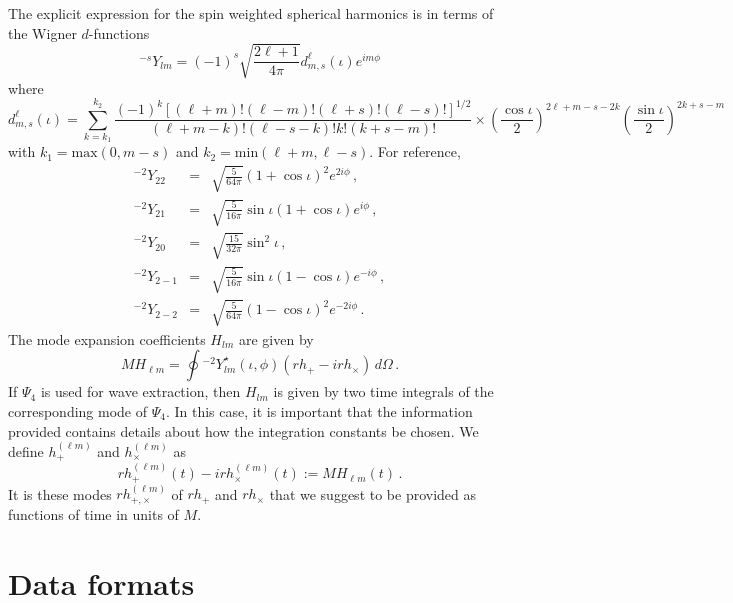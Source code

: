 \documentclass[prd,preprintnumbers,superscriptaddress,eqsecnum]{revtex4}
\numberwithin{equation}{section}
\newcommand{\Ys}{{{}^{-s}Y}}
\newcommand{\Ytwo}{{{}^{-2}Y}}
\begin{document}
{The explicit expression for the spin weighted spherical harmonics is
in terms of the Wigner $d$-functions
\begin{equation}
  \label{eq:5}
   \Ys_{lm} = (-1)^s\sqrt{\frac{2\ell+1}{4\pi}} d^\ell_{m,s}(\iota)e^{im\phi}
\end{equation}
where
\begin{equation}
  \label{eq:6}
  d^\ell_{m,s}(\iota) = \sum_{k = k_1}^{k_2}
    \frac{(-1)^k[(\ell+m)!(\ell-m)!(\ell+s)!(\ell-s)!]^{1/2}}{(\ell +m
      -k)!(\ell-s-k)!k!(k+s-m)!}  
    \times \left(\frac{\cos\iota}{2}\right)^{2\ell+m-s-2k}\left(\frac{\sin\iota}{2}\right)^{2k+s-m}  
\end{equation}
with $k_1 = \textrm{max}(0, m-s)$ and $k_2=\textrm{min}(\ell+m,
\ell-s)$.  For reference,
\begin{eqnarray}
  \label{eq:7}
  \Ytwo_{22} &=& \sqrt{\frac{5}{64\pi}}(1+\cos\iota)^2e^{2i\phi} \,,\\
  \Ytwo_{21} &=& \sqrt{\frac{5}{16\pi}}  \sin\iota( 1 + \cos\iota )e^{i\phi} \,,\\
  \Ytwo_{20} &=& \sqrt{\frac{15}{32\pi}} \sin^2\iota \,,\\
  \Ytwo_{2-1} &=& \sqrt{\frac{5}{16\pi}}  \sin\iota( 1 - \cos\iota
  )e^{-i\phi} \,,\\
  \Ytwo_{2-2} &=& \sqrt{\frac{5}{64\pi}}(1-\cos\iota)^2e^{-2i\phi}\,.
\end{eqnarray}
The mode expansion coefficients $H_{lm}$ are given by
\begin{equation}
  \label{eq:10}
  MH_{\ell m} = \oint \Ytwo_{lm}^\star(\iota,\phi)(rh_+-irh_\times )\,d\Omega\,.
\end{equation}
If $\Psi_4$ is used for wave extraction, then $H_{lm}$ is given by two
time integrals of the corresponding mode of $\Psi_4$.  In this case, it
is important that the information provided contains details about how
the integration constants be chosen.  We define $h_+^{(\ell m)}$ and
$h_\times^{(\ell m)}$ as
\begin{equation}
  \label{eq:11}
  rh_+^{(\ell m)}(t) -irh_\times^{(\ell m)}(t) := MH_{\ell m}(t)\,.  
\end{equation}
It is these modes $rh_{+,\times}^{(\ell m)}$ of $rh_+$ and $rh_\times$
that we suggest to be provided as functions of time in units of $M$.




\section{Data formats}
\label{sec:format}


}
\end{document}
